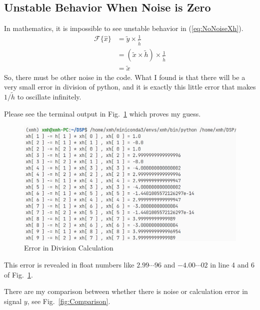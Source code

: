 \documentclass{article}
\begin{document}
\subsection{Unstable Behavior When Noise is Zero}
In mathematics, it is impossible to see unstable behavior in (\ref{eq:NoNoiseXh}).
\begin{equation}
	\begin{aligned}
		\mathcal{F}\{\hat{x}\} &= \tilde{y} \times \frac{1}{\tilde{h}} \\  
		&= ( \tilde{x} \times \tilde{h}) \times \frac{1}{\tilde{h}} \\ 
		&= \tilde{x}
	\end{aligned}
\label{eq:NoNoiseXh}
\end{equation}
So, there must be other noise in the code. What I found is that there will be a very small error in division of python, and it is exactly this little error that makes $1/\tilde{h}$ to oscillate infinitely.

Please see the terminal output in Fig.~\ref{fig:CalculationError} which proves my guess.
\begin{figure}[!h]
	\centering
	\includegraphics[width=3 in]{../pic/CalculationError.png}
	\caption{Error in Division Calculation}
	\label{fig:CalculationError}
\end{figure}

This error is revealed in float numbers like $2.99\cdots96$ and $-4.00\cdots02$ in line 4 and 6 of Fig.~\ref{fig:CalculationError}.

There are my comparison between whether there is noise or calculation error in signal $y$, see Fig.~\ref{fig:Comparison}.

\end{document}
